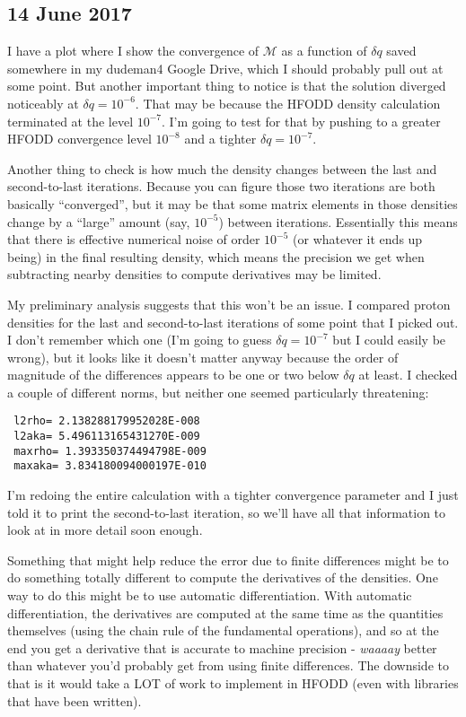 \subsection*{14 June 2017}
I have a plot where I show the convergence of $\mathcal{M}$ as a function of $\delta q$ saved somewhere in my dudeman4 Google Drive, which I should probably pull out at some point. But another important thing to notice is that the solution diverged noticeably at $\delta q = 10^{-6}$. That may be because the HFODD density calculation terminated at the level $10^{-7}$. I'm going to test for that by pushing to a greater HFODD convergence level $10^{-8}$ and a tighter $\delta q = 10^{-7}$.

Another thing to check is how much the density changes between the last and second-to-last iterations. Because you can figure those two iterations are both basically ``converged'', but it may be that some matrix elements in those densities change by a ``large'' amount (say, $10^{-5}$) between iterations. Essentially this means that there is effective numerical noise of order $10^{-5}$ (or whatever it ends up being) in the final resulting density, which means the precision we get when subtracting nearby densities to compute derivatives may be limited.

My preliminary analysis suggests that this won't be an issue. I compared proton densities for the last and second-to-last iterations of some point that I picked out. I don't remember which one (I'm going to guess $\delta q = 10^{-7}$ but I could easily be wrong), but it looks like it doesn't matter anyway because the order of magnitude of the differences appears to be one or two below $\delta q$ at least. I checked a couple of different norms, but neither one seemed particularly threatening:

\begin{verbatim}
 l2rho= 2.138288179952028E-008
 l2aka= 5.496113165431270E-009
 maxrho= 1.393350374494798E-009
 maxaka= 3.834180094000197E-010
\end{verbatim}

I'm redoing the entire calculation with a tighter convergence parameter and I just told it to print the second-to-last iteration, so we'll have all that information to look at in more detail soon enough.

Something that might help reduce the error due to finite differences might be to do something totally different to compute the derivatives of the densities. One way to do this might be to use automatic differentiation. With automatic differentiation, the derivatives are computed at the same time as the quantities themselves (using the chain rule of the fundamental operations), and so at the end you get a derivative that is accurate to machine precision - \textit{waaaay} better than whatever you'd probably get from using finite differences. The downside to that is it would take a LOT of work to implement in HFODD (even with libraries that have been written).

